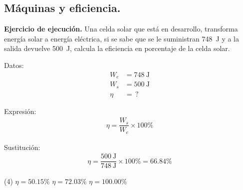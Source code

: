 \documentclass[12pt, letter]{exam}
\begin{document}
\begin{questions}


    \section{Máquinas y eficiencia.}

    \setcounter{question}{36} \question \label{Ejercicio_15} \textbf{Ejercicio de ejecución. } Una celda solar que está en desarrollo, transforma energía solar a energía eléctrica, si se sabe que se le suministran \SI{748}{\joule} y a la salida devuelve \SI{500}{\joule}, calcula la eficiencia en porcentaje de la celda solar.

    \begin{minipage}[t]{0.35\linewidth}
    Datos: 
    \begin{align*}
    W_{e} &= \SI{748}{\joule} \\
    W_{s} &= \SI{500}{\joule} \\
    \eta &= \, ?
    \end{align*}
    \end{minipage}
    \hspace{1cm}
    \begin{minipage}[t]{0.4\linewidth}
    Expresión:
    \begin{align*}
        \eta = \dfrac{W_{s}}{W_{e}} \times 100 \%
    \end{align*}
    \end{minipage}

    Sustitución:
    \begin{align*}
    \eta = \dfrac{\SI{500}{\joule}}{\SI{748}{\joule}} \times 100 \% = \num{66.84} \%
    \end{align*}
    \begin{tasks}(4)
        \task $\eta = 50.15 \%$
        \task {}
        \task $\eta = 72.03 \%$
        \task $\eta = 100.00 \%$
    \end{tasks}

\end{questions}
\end{document}
